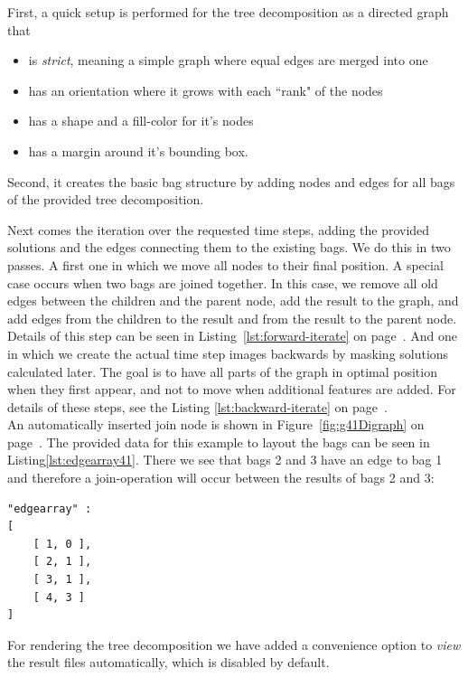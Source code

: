 \documentclass[a4paper, 12pt, bibliography=totoc]{scrartcl}
\begin{document}
First, a quick setup is performed for the tree decomposition as a directed graph that 
\begin{itemize}
	\item is \textit{strict}, meaning a simple graph where equal edges are merged into one
	\item has an orientation where it grows with each ``rank" of the nodes
	\item has a shape and a fill-color for it's nodes
	\item has a margin around it's bounding box.
\end{itemize}

Second, it creates the basic bag structure by adding nodes and edges for all bags of the provided tree decomposition.

Next comes the iteration over the requested time steps, adding the provided solutions and the edges connecting them to the existing bags. We do this in two passes.  A first one in which we move all nodes to their final position. A special case occurs when two bags are joined together.
In this case, we remove all old edges between the children and the parent node, add the result to the graph, and add edges from the children to the result and from the result to the parent node. Details of this step can be seen in Listing~\ref{lst:forward-iterate} on page~\pageref{lst:forward-iterate}. And one in which we create the actual time step images backwards by masking solutions calculated later. The goal is to have all parts of the graph in optimal position when they first appear, and not to move when additional features are added. For details of these steps, see the Listing \ref{lst:backward-iterate} on page~\pageref{lst:backward-iterate}.\\

An automatically inserted join node is shown in Figure~\ref{fig:g41Digraph} on page~\pageref{fig:g41Digraph}.
The provided data for this example to layout the bags can be seen in Listing\ref{lst:edgearray41}. There we see that bags 2 and 3 have an edge to bag 1 and therefore a join-operation will occur between the results of bags 2 and 3:

\begin{lstlisting}[caption={Structure provided for bags of example \ref{fig:g41Digraph} },label={lst:edgearray41},numbers=none,backgroundcolor=\color{white}]
"edgearray" : 
[
	[ 1, 0 ],
	[ 2, 1 ],
	[ 3, 1 ],
	[ 4, 3 ]
]
\end{lstlisting}

For rendering the tree decomposition we have added a convenience option to \textit{view} the result files automatically, which is disabled by default.
\end{document}
